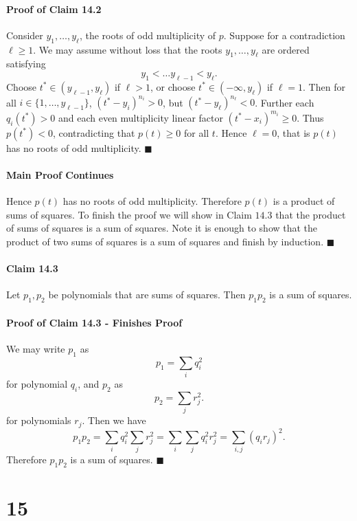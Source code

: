\documentclass[letterpaper,12pt,oneside,onecolumn]{article}
\newcommand{\1}{\mathbbm{1}}
\begin{document}
\paragraph{Proof of Claim 14.2}
Consider $y_1, \dots, y_\ell$, the roots of odd multiplicity of $p$. Suppose for a contradiction $\ell \geq 1$. We may assume without loss that the roots $y_1, \dots, y_\ell$ are ordered satisfying
$$y_1 < \dots y_{\ell -1}< y_\ell.$$
Choose $t^* \in (y_{\ell-1}, y_\ell)$ if $\ell >1$, or choose $t^* \in (-\infty, y_\ell)$ if $\ell = 1$. Then for all $i \in \{1, \dots, y_{\ell - 1}\}$, $(t^* - y_i)^{n_i} > 0$, but $(t^* - y_\ell)^{n_\ell} < 0$. Further each $q_i(t^*) > 0$ and each even multiplicity linear factor $(t^* - x_i)^{m_i} \geq 0$. Thus $p(t^*) < 0$, contradicting that $p(t) \geq 0$ for all $t$. Hence $\ell = 0$, that is $p(t)$ has no roots of odd multiplicity. $\blacksquare$
\paragraph{Main Proof Continues}
Hence $p(t)$ has no roots of odd multiplicity. Therefore $p(t)$ is a product of sums of squares. To finish the proof we will show in Claim $14.3$ that the product of sums of squares is a sum of squares. Note it is enough to show that the product of two sums of squares is a sum of squares and finish by induction. $\blacksquare$
\paragraph{Claim 14.3}
Let $p_1,p_2$ be polynomials that are sums of squares. Then $p_1p_2$ is a sum of squares.
\paragraph{Proof of Claim 14.3 - Finishes Proof}
We may write $p_1$ as
$$p_1 = \sum_i q_i^2$$
for polynomial $q_i$, and $p_2$ as 
$$p_2 = \sum_j r_j^2.$$
for polynomials $r_j$. Then we have
$$p_1p_2 = \sum_i q_i^2 \sum_j r_j^2 = \sum_i\sum_j q_i^2r_j^2 = \sum_{i,j} (q_ir_j)^2.$$
Therefore $p_1p_2$ is a sum of squares. $\blacksquare$
\section*{15}
\end{document}
